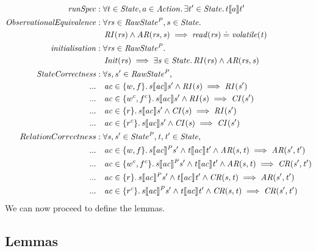 \documentclass[a4paper,11pt]{article}
\theoremstyle{definition}
\begin{document}
\begin{align*}
	\mathit{runSpec} &: \forall t \in \mathit{State}, a \in \mathit{Action} \ldotp \exists t' \in \mathit{State} \ldotp t \llbracket a \rrbracket t'\\
	\mathit{Observational Equivalence} &: \forall \mathit{rs} \in \mathit{RawState^P},s \in \mathit{State} \ldotp\\
	 & \quad \mathit{RI(rs)} \land \mathit{AR(rs, s)} \implies \mathit{read(rs)} \doteq \mathit{volatile(t)}\\
	\mathit{initialisation} &: \forall \mathit{rs} \in \mathit{RawState^P} \ldotp\\ 
	 &\quad \mathit{Init(rs) \implies \exists s \in State \ldotp RI(rs) \land AR(rs, s)}\\
	 \mathit{StateCorrectness} &: \forall s, s' \in \mathit{RawState^P},\\ 
	...	 &\quad \mathit{ac} \in \{w, f\} \ldotp \mathit{s \llbracket ac \rrbracket s' \land RI(s) \implies RI(s')}\\
	...	 &\quad \mathit{ac} \in \{w^c, f^c\} \ldotp \mathit{s \llbracket ac \rrbracket s' \land RI(s) \implies CI(s')}\\
	...	 &\quad \mathit{ac} \in \{r\} \ldotp \mathit{s \llbracket ac \rrbracket s' \land CI(s) \implies RI(s')}\\
	...	 &\quad \mathit{ac} \in \{r^c\} \ldotp \mathit{s \llbracket ac \rrbracket s' \land CI(s) \implies CI(s')}\\
	RelationCorrectness &: \mathit{\forall s, s' \in State^P, t, t' \in State,}\\
	...	& \quad \mathit{ac} \in \{w, f\} \ldotp \mathit{s \llbracket ac \rrbracket^P s' \land t \llbracket ac \rrbracket t' \land AR(s, t) \implies AR(s', t')}\\
	...	& \quad \mathit{ac} \in \{w^c, f^c\} \ldotp \mathit{s \llbracket ac \rrbracket^P s' \land t \llbracket ac \rrbracket t' \land AR(s, t) \implies CR(s', t')}\\
	...	& \quad \mathit{ac} \in \{r\} \ldotp \mathit{s \llbracket ac \rrbracket^P s' \land t \llbracket ac \rrbracket t' \land CR(s, t) \implies AR(s', t')}\\
	...	& \quad \mathit{ac} \in \{r^c\} \ldotp \mathit{s \llbracket ac \rrbracket^P s' \land t \llbracket ac \rrbracket t' \land CR(s, t) \implies CR(s', t')}\\
\end{align*}
We can now proceed to define the lemmas.


\subsection{Lemmas}
\end{document}
